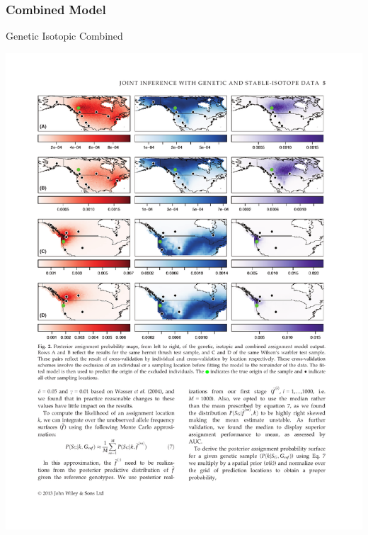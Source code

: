 \documentclass[t]{beamer}\usepackage[]{graphicx}\usepackage[]{color}
\begin{document}
% 
%  
% 
% 
% 


\begin{frame}
\frametitle{Combined Model}

\vfill

\begin{center}

Genetic \qquad\qquad\qquad\quad
Isotopic \qquad\qquad\qquad\quad
Combined

\end{center}

\begin{center}
\includegraphics[width=\textwidth]{figs/hermit_maps.pdf}
\end{center}

\vfill

\end{frame}
\end{document}
